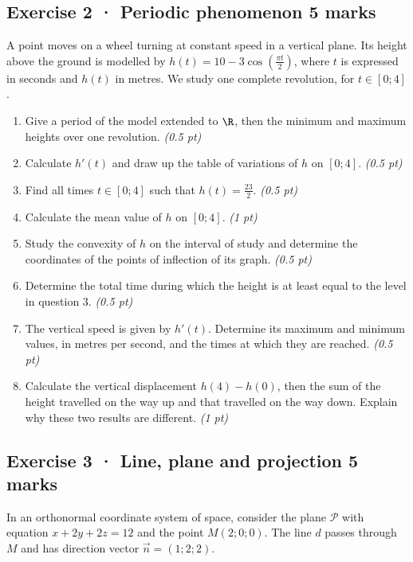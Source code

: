 \subsection*{Exercise 2 · Periodic phenomenon \hfill 5 marks}A point moves on a wheel turning at constant speed in a vertical plane. Its height above the ground is modelled by $h(t)=10-3\cos\left(\frac{\pi t}{2}\right)$, where $t$ is expressed in seconds and $h(t)$ in metres. We study one complete revolution, for $t\in[0;4]$.

\begin{enumerate}

\item Give a period of the model extended to $\R$, then the minimum and maximum heights over one revolution. \hfill\textit{(0.5 pt)}

\item Calculate $h'(t)$ and draw up the table of variations of $h$ on $[0;4]$. \hfill\textit{(0.5 pt)}

\item Find all times $t\in[0;4]$ such that $h(t)=\frac{23}{2}$. \hfill\textit{(0.5 pt)}

\item Calculate the mean value of $h$ on $[0;4]$. \hfill\textit{(1 pt)}

\item Study the convexity of $h$ on the interval of study and determine the coordinates of the points of inflection of its graph. \hfill\textit{(0.5 pt)}

\item Determine the total time during which the height is at least equal to the level in question 3. \hfill\textit{(0.5 pt)}

\item The vertical speed is given by $h'(t)$. Determine its maximum and minimum values, in metres per second, and the times at which they are reached. \hfill\textit{(0.5 pt)}

\item Calculate the vertical displacement $h(4)-h(0)$, then the sum of the height travelled on the way up and that travelled on the way down. Explain why these two results are different. \hfill\textit{(1 pt)}

\end{enumerate}

\clearpage{}\par

\subsection*{Exercise 3 · Line, plane and projection \hfill 5 marks}In an orthonormal coordinate system of space, consider the plane $\mathcal P$ with equation $x+2y+2z=12$ and the point $M(2;0;0)$. The line $d$ passes through $M$ and has direction vector $\vec n=(1;2;2)$.

